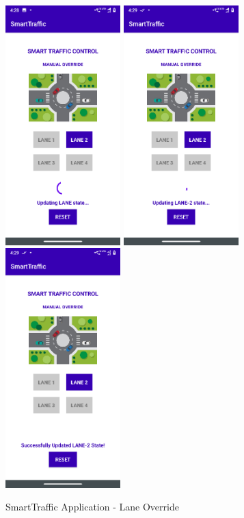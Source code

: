 \pagebreak

\begin{figure}[h]\centering
	\includegraphics[width=1.75in]{./images/LaneOverride1.png}
        \includegraphics[width=1.75in]{./images/LaneOverride2.png}
        \includegraphics[width=1.75in]{./images/LaneOverride3.png}
	\caption{SmartTraffic Application - Lane Override}\label{LaneOverride}
\end{figure}

